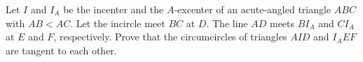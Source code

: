Let $I$ and $I_A$ be the incenter and the $A$-excenter of an acute-angled triangle $ABC$ with $AB < AC$. Let the incircle meet $BC$ at $D$. The line $AD$ meets $BI_A$ and $CI_A$ at $E$ and $F$, respectively. Prove that the circumcircles of triangles $AID$ and $I_AEF$ are tangent to each other.
